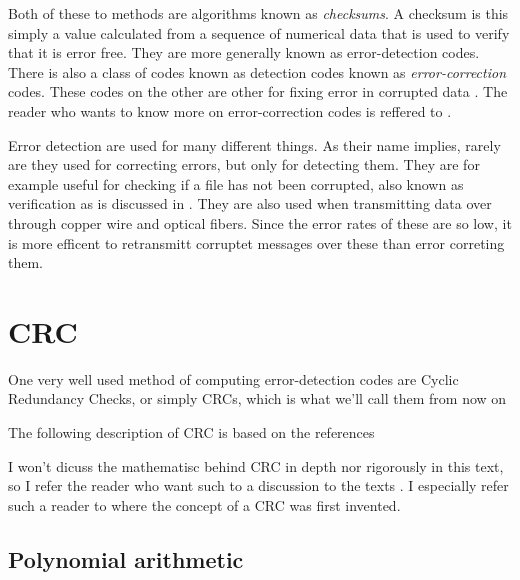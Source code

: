 Both of these to methods are algorithms known as
\textit{checksums}. A checksum is this simply a value
calculated from a sequence of numerical data that is used to verify
that it is error free. They are more generally known as
error-detection codes. There is also a class of codes known as
detection codes known as \textit{error-correction} codes. These codes
on the other are other for fixing error in corrupted data
\cite{tanenbaum2003computernetworks_crc}. The reader who wants to know
more on error-correction codes is reffered to \cite{tanenbaum2003computernetworks_crc,1950hamming_codes_crc_parity,hamming1986coding_information_theory_detection_correction}.

Error detection are used for many different things. As their name
implies, rarely are they used for correcting errors, but only for
detecting them. They are for example useful for checking if a file has
not been corrupted, also known as verification as is discussed in
\cite{Nelson:1992:FVU:135011.135017_crc32}. They are also used when
transmitting data over through copper wire and optical fibers. Since
the error rates of these are so low, it is more efficent to
retransmitt corruptet messages over these than error correting
them\cite{tanenbaum2003computernetworks_crc}.

\section{CRC}

One very well used method of computing error-detection codes are
Cyclic Redundancy Checks, or simply CRCs, which is what we'll call them from now
on \cite{tanenbaum2003computernetworks_crc}

The following description of CRC is based on the references \cite{Ritter:1986:GCM:12647.12648,Williams_1993_crc_painless,tanenbaum2003computernetworks_crc,Nelson:1992:FVU:135011.135017_crc32,Stigge06reversingcrc}

I won't dicuss the mathematisc behind CRC in depth nor
rigorously in this text, so I refer the reader who want such to a
discussion to the texts
\cite{Stigge06reversingcrc,tanenbaum2003computernetworks_crc,Peterson_Brown_1961_crc_orig,press2007numerical_recipes,Ramabadran:1988:TCC:623224.623360_crc_tutorial}. I
especially refer such a reader to \cite{Peterson_Brown_1961_crc_orig}
where the concept of a CRC was first invented.

\subsection{Polynomial arithmetic}

